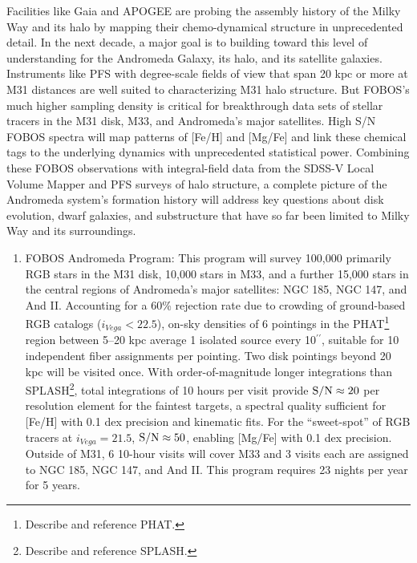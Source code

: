 \documentclass[oneside,11pt]{amsart}
\newcommand{\arcsec}{\mbox{$^{\prime\prime}$}}
\newcounter{chalno}
\newcommand{\chal}[1]{\refstepcounter{chalno}\label{#1}}
\begin{document}
Facilities like Gaia and APOGEE are probing the assembly history of the Milky Way and its halo by mapping their
chemo-dynamical structure in unprecedented detail.  In the next decade, a major goal is to building toward this level
of understanding for the Andromeda Galaxy, its halo, and its satellite galaxies.  Instruments like PFS with
degree-scale fields of view that span 20 kpc or more at M31 distances are well suited to characterizing M31 halo
structure.  But FOBOS's much higher sampling density is critical for breakthrough data sets of stellar tracers in the
M31 disk, M33, and Andromeda's major satellites.  High S/N FOBOS spectra will map patterns of [Fe/H] and [Mg/Fe] and
link these chemical tags to the underlying dynamics with unprecedented statistical power.  Combining these FOBOS
observations with integral-field data from the SDSS-V Local Volume Mapper and PFS surveys of halo structure, a complete
picture of the Andromeda system's formation history will address key questions about disk evolution, dwarf galaxies,
and substructure that have so far been limited to Milky Way and its surroundings.



\begin{enumerate}[rightmargin=0.2cm,leftmargin=0.2cm]

\chal{stellar} 
%
\item[] {\textsf {\large FOBOS Andromeda Program:}} This program will survey 100,000 primarily RGB stars in the M31 disk, 10,000 stars in M33, and a further 15,000 stars in the central regions of Andromeda's major satellites: NGC 185, NGC 147, and And II.  Accounting for a 60\% rejection rate \citep[see][]{dorman12} due to crowding of ground-based RGB catalogs ($i_{Vega} < 22.5$), on-sky densities of 6 pointings in the PHAT\footnote{Describe and reference PHAT.} region between 5--20 kpc average 1 isolated source every 10\arcsec{}, suitable for 10 independent fiber assignments per pointing.  Two disk pointings beyond 20 kpc will be visited once.  With order-of-magnitude longer integrations than SPLASH\footnote{Describe and reference SPLASH.}, total integrations of 10 hours per visit provide ${\rm S/N} \approx 20$ per resolution element for the faintest targets, a spectral quality sufficient for [Fe/H] with 0.1 dex precision and kinematic fits.  For the ``sweet-spot'' of RGB tracers at $i_{Vega} = 21.5$, ${\rm S/N} \approx 50$, enabling [Mg/Fe] with 0.1 dex precision.  Outside of M31, 6 10-hour visits will cover M33 and 3 visits each are assigned to NGC 185, NGC 147, and And II.  This program requires 23 nights per year for 5 years.  




\end{enumerate}
\end{document}
